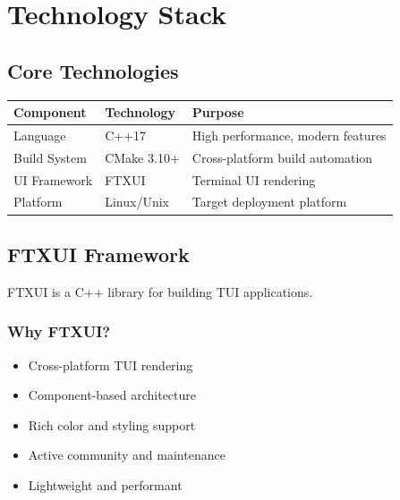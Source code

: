 \documentclass[12pt,a4paper,oneside,openany]{report}
\begin{document}
\chapter{Technology Stack}

\section{Core Technologies}

\begin{table}[H]
	\centering
	\begin{tabular}{|l|l|l|}
		\hline
		\textbf{Component} & \textbf{Technology} & \textbf{Purpose}                  \\
		\hline
		Language           & C++17               & High performance, modern features \\
		\hline
		Build System       & CMake 3.10+         & Cross-platform build automation   \\
		\hline
		UI Framework       & FTXUI               & Terminal UI rendering             \\
		\hline
		Platform           & Linux/Unix          & Target deployment platform        \\
		\hline
	\end{tabular}
\end{table}

\section{FTXUI Framework}

FTXUI is a C++ library for building TUI applications.

\subsection{Why FTXUI?}

\begin{itemize}
	\item Cross-platform TUI rendering
	\item Component-based architecture
	\item Rich color and styling support
	\item Active community and maintenance
	\item Lightweight and performant
\end{itemize}
\end{document}
